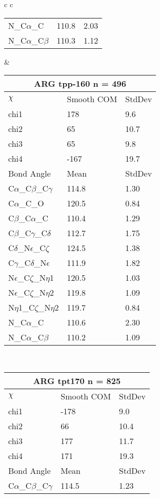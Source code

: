 \begin{longtable}{ c c }
\begin{tabular}{ l l l }
  N\_C$\alpha$\_C & 110.8 & 2.03\\
  N\_C$\alpha$\_C$\beta$ & 110.3 & 1.12\\
  \bottomrule
  \end{tabular}
  &
  \begin{tabular}{ l l l }
  \toprule
  \multicolumn{3}{c}{ARG \textbf{tpp-160} n = 496} \\ \toprule
  $\chi$       & Smooth COM & StdDev \\ \midrule
  chi1 & 178 & 9.6 \\ 
  chi2 & 65 & 10.7 \\ 
  chi3 & 65 & 9.8 \\ 
  chi4 & -167 & 19.7 \\ \midrule
  Bond Angle   & Mean     & StdDev \\ \midrule
  C$\alpha$\_C$\beta$\_C$\gamma$ & 114.8 & 1.30\\
  C$\alpha$\_C\_O & 120.5 & 0.84\\
  C$\beta$\_C$\alpha$\_C & 110.4 & 1.29\\
  C$\beta$\_C$\gamma$\_C$\delta$ & 112.7 & 1.75\\
  C$\delta$\_N$\epsilon$\_C$\zeta$ & 124.5 & 1.38\\
  C$\gamma$\_C$\delta$\_N$\epsilon$ & 111.9 & 1.82\\
  N$\epsilon$\_C$\zeta$\_N$\eta$1 & 120.5 & 1.03\\
  N$\epsilon$\_C$\zeta$\_N$\eta$2 & 119.8 & 1.09\\
  N$\eta$1\_C$\zeta$\_N$\eta$2 & 119.7 & 0.84\\
  N\_C$\alpha$\_C & 110.6 & 2.30\\
  N\_C$\alpha$\_C$\beta$ & 110.2 & 1.09\\
  \bottomrule
  \end{tabular}
  \\
  \begin{tabular}{ l l l }
  \toprule
  \multicolumn{3}{c}{ARG \textbf{tpt170} n = 825} \\ \toprule
  $\chi$       & Smooth COM & StdDev \\ \midrule
  chi1 & -178 & 9.0 \\ 
  chi2 & 66 & 10.4 \\ 
  chi3 & 177 & 11.7 \\ 
  chi4 & 171 & 19.3 \\ \midrule
  Bond Angle   & Mean     & StdDev \\ \midrule
  C$\alpha$\_C$\beta$\_C$\gamma$ & 114.5 & 1.23\\

\end{tabular}
\end{longtable}
